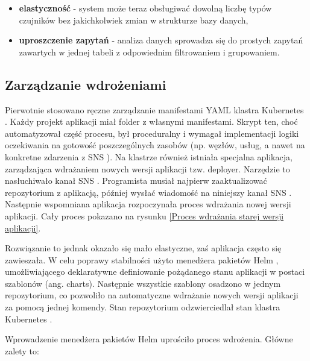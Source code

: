 {\vspace{0.3em}

\begin{itemize}
    \item \textbf{elastyczność} - system może teraz obsługiwać dowolną liczbę typów czujników bez jakichkolwiek zmian w strukturze bazy danych,
    \item \textbf{uproszczenie zapytań} - analiza danych sprowadza się do prostych zapytań zawartych w jednej tabeli z odpowiednim filtrowaniem i grupowaniem.
\end{itemize}

\subsection{Zarządzanie wdrożeniami}

Pierwotnie stosowano ręczne zarządzanie manifestami YAML \cite{yaml_spec} klastra Kubernetes \cite{kubernetes}. Każdy projekt aplikacji miał folder z własnymi manifestami. Skrypt ten, choć automatyzował część procesu, był proceduralny i wymagał implementacji logiki oczekiwania na gotowość poszczególnych zasobów (np. węzłów, usług, a nawet na konkretne zdarzenia z SNS \cite{sns_docs}). Na klastrze również istniała specjalna aplikacja, zarządzająca wdrażaniem nowych wersji aplikacji tzw. deployer. Narzędzie to nasłuchiwało kanał SNS \cite{sns_docs}. Programista musiał najpierw zaaktualizować repozytorium z aplikacją, później wysłać wiadomość na niniejszy kanał SNS \cite{sns_docs}. Następnie wspomniana aplikacja rozpoczynała proces wdrażania nowej wersji aplikacji. Cały proces pokazano na rysunku \ref{Proces wdrażania starej wersji aplikacji}.


Rozwiązanie to jednak okazało się mało elastyczne, zaś aplikacja często się zawieszała. W celu poprawy stabilności użyto menedżera pakietów Helm \cite{helm_docs}, umożliwiającego deklaratywne definiowanie pożądanego stanu aplikacji w postaci szablonów (ang. \mbox{charts}). Następnie wszystkie szablony osadzono w jednym repozytorium, co pozwoliło na automatyczne wdrażanie nowych wersji aplikacji za pomocą jednej komendy. Stan repozytorium odzwierciedlał stan klastra Kubernetes \cite{kubernetes}.

Wprowadzenie menedżera pakietów Helm \cite{helm_docs} uprościło proces wdrożenia. Główne zalety to:

\vspace{0.3em}

}
